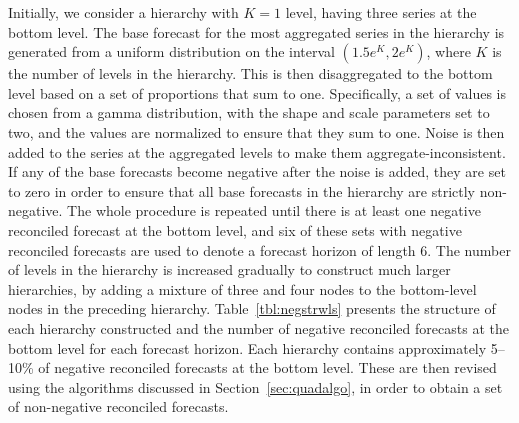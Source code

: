 \documentclass[11pt]{article}
\newcommand{\0}{\phantom{0}}
\begin{document}
Initially, we consider a hierarchy with $K=1$ level, having three series at the bottom level. The base forecast for the most aggregated series in the hierarchy is generated from a uniform distribution on the interval $(1.5e^{K}, 2e^{K})$, where $K$ is the number of levels in the hierarchy. This is then disaggregated to the bottom level based on a set of proportions that sum to one. Specifically, a set of values is chosen from a gamma distribution, with the shape and scale parameters set to two, and the values are normalized to ensure that they sum to one. Noise is then added to the series at the aggregated levels to make them aggregate-inconsistent. If any of the base forecasts become negative after the noise is added, they are set to zero in order to ensure that all base forecasts in the hierarchy are strictly non-negative. The whole procedure is repeated until there is at least one negative reconciled forecast at the bottom level, and six of these sets with negative reconciled forecasts are used to denote a forecast horizon of length 6. The number of levels in the hierarchy is increased gradually to construct much larger hierarchies, by adding a mixture of three and four nodes to the bottom-level nodes in the preceding hierarchy. Table~\ref{tbl:negstrwls} presents the structure of each hierarchy constructed and the number of negative reconciled forecasts at the bottom level for each forecast horizon. Each hierarchy contains approximately 5--10\% of negative reconciled forecasts at the bottom level. These are then revised using the algorithms discussed in Section~\ref{sec:quadalgo}, in order to obtain a set of non-negative reconciled forecasts.
\end{document}
